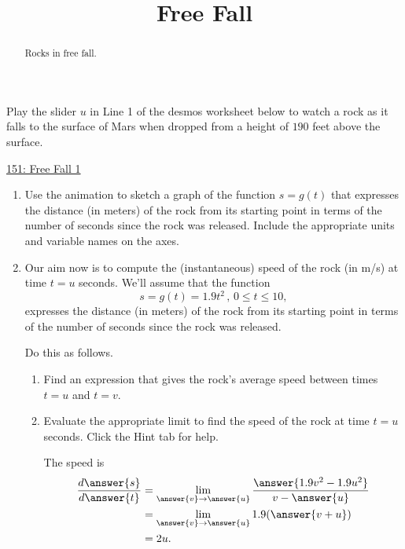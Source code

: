 \documentclass{ximera}
\title{Free Fall}
\begin{document}
\begin{abstract}
Rocks in free fall.
\end{abstract}
\maketitle



\begin{exploration}  \label{Qvbbtrg43444}

Play the slider $u$ in Line 1 of the desmos worksheet below to watch a rock as it falls to the surface of Mars when dropped from a height of $190$ feet above the surface.

\begin{onlineOnly}
    \begin{center}
\end{center}
\end{onlineOnly}

\href{https://www.desmos.com/calculator/gwhbaag99o}{151: Free Fall 1}

\begin{enumerate}
\item Use the animation to sketch a graph of the function $s=g(t)$ that expresses the distance (in meters) of the rock from its starting point in terms of the number of seconds since the rock was released. Include the appropriate units and variable names on the axes.

\item Our aim now is to compute the (instantaneous) speed of the rock (in m/s) at time $t=u$ seconds. We'll assume that the function 
\[
      s = g(t) = 1.9t^2 \, , \, 0\leq t \leq 10,
\] 
expresses the distance (in meters) of the rock from its starting point in terms of the number of seconds since the rock was released.

Do this as follows.  

\begin{enumerate}
\item Find an expression that gives the rock's average speed between times $t=u$ and $t=v$.

\item Evaluate the appropriate limit to find the speed of the rock at time $t=u$ seconds. Click the Hint tab for help.

\begin{hint}

The speed is
\begin{align*}
    \frac{d\answer{s}}{d\answer{t}}  &=      \lim_{\answer{v}\to \answer{u}} \frac{\answer{1.9v^2-1.9u^2}}{v-\answer{u}}   \\
                                                       & = \lim_{\answer{v}\to \answer{u}} 1.9(\answer{v+u}) \\
                                                       & = 2u .
 \end{align*}



\end{hint}
\end{enumerate}
\end{enumerate}
\end{exploration}
\end{document}

